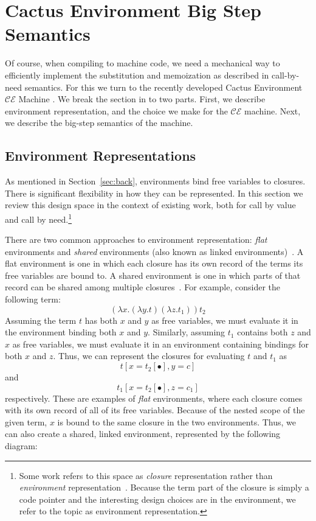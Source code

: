 \section{Cactus Environment Big Step Semantics}

Of course, when compiling to machine code, we need a mechanical way to
efficiently implement the substitution and memoization as described in
call-by-need semantics. For this we turn to the recently developed Cactus
Environment $\mathcal{CE}$ Machine \cite{?}. We break the section in to two
parts. First, we describe environment representation, and the choice we make for
the $\mathcal{CE}$ machine. Next, we describe the big-step semantics of the
machine.

\subsection{Environment Representations}

As mentioned in Section~\ref{sec:back}, environments bind free variables to
closures. There is significant flexibility in how they can be represented. In
this section we review this design space in the context of existing work, both
for call by value and call by need.\footnote{Some work refers to this space as
\emph{closure} representation rather than \emph{environment}
representation~\cite{shao1994space,appel1988optimizing}.  Because the term
part of the closure is simply a code pointer and the interesting design
choices are in the environment, we refer to the topic as environment
representation.}

There are two common approaches to environment representation: \emph{flat}
environments and \emph{shared} environments (also known as linked
environments)~\cite{appel1988optimizing,shao1994space}. A flat environment is
one in which each closure has its own record of the terms its free variables are
bound to. A shared environment is one in which parts of that record can be
shared among multiple closures~\cite{appel1988optimizing,shao1994space}. For
example, consider the following term: $$(\lambda x.(\lambda y.t) (\lambda
z.t_1)) t_2$$ Assuming the term $t$ has both $x$ and $y$ as free variables, we
must evaluate it in the environment binding both $x$ and $y$.  Similarly,
assuming $t_1$ contains both $z$ and $x$ as free variables, we must evaluate it
in an environment containing bindings for both $x$ and $z$. Thus, we can
represent the closures for evaluating $t$ and $t_1$  as $$t[x=t_2[\bullet],
y=c]$$ and $$t_1[x=t_2[\bullet], z=c_1]$$ respectively.  These are examples of
\emph{flat} environments, where each closure comes with its own record of all of
its free variables. Because of the nested scope of the given term, $x$ is bound
to the same closure in the two environments. Thus, we can also create a shared,
linked environment, represented by the following diagram:


